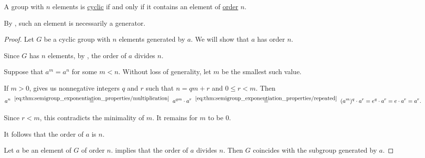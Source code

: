 \begin{lemma}\label{thm:cyclic_group_generator_order}
  A group with \( n \) elements is \hyperref[def:cyclic_group]{cyclic} if and only if it contains an element of \hyperref[def:group_element_order]{order} \( n \).
\end{lemma}
\begin{comments}
  \item By , such an element is necessarily a generator.
\end{comments}
\begin{proof}
  \SufficiencySubProof Let \( G \) be a cyclic group with \( n \) elements generated by \( a \). We will show that \( a \) has order \( n \).

  Since \( G \) has \( n \) elements, by , the order of \( a \) divides \( n \).

  Suppose that \( a^m = a^n \) for some \( m < n \). Without loss of generality, let \( m \) be the smallest such value.

  If \( m > 0 \),  gives us nonnegative integers \( q \) and \( r \) such that \( n = qm + r \) and \( 0 \leq r < m \). Then
  \begin{equation*}
    a^n
    \reloset {\eqref{eq:thm:semigroup_exponentiation_properties/multiplication}} =
    a^{qm} \cdot a^r
    \reloset {\eqref{eq:thm:semigroup_exponentiation_properties/repeated}} =
    (a^m)^q \cdot a^r
    =
    e^q \cdot a^r
    =
    e \cdot a^r
    =
    a^r.
  \end{equation*}

  Since \( r < m \), this contradicts the minimality of \( m \). It remains for \( m \) to be \( 0 \).

  It follows that the order of \( a \) is \( n \).

  \NecessitySubProof Let \( a \) be an element of \( G \) of order \( n \).  implies that the order of \( a \) divides \( n \). Then \( G \) coincides with the subgroup generated by \( a \).
\end{proof}

